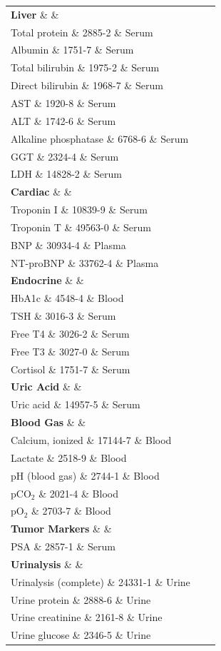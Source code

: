 \begin{longtable}{@{}lll@{}}
\textbf{Liver} \& \& \\
Total protein \& 2885-2 \& Serum \\
Albumin \& 1751-7 \& Serum \\
Total bilirubin \& 1975-2 \& Serum \\
Direct bilirubin \& 1968-7 \& Serum \\
AST \& 1920-8 \& Serum \\
ALT \& 1742-6 \& Serum \\
Alkaline phosphatase \& 6768-6 \& Serum \\
GGT \& 2324-4 \& Serum \\
LDH \& 14828-2 \& Serum \\
\textbf{Cardiac} \& \& \\
Troponin I \& 10839-9 \& Serum \\
Troponin T \& 49563-0 \& Serum \\
BNP \& 30934-4 \& Plasma \\
NT-proBNP \& 33762-4 \& Plasma \\
\textbf{Endocrine} \& \& \\
HbA1c \& 4548-4 \& Blood \\
TSH \& 3016-3 \& Serum \\
Free T4 \& 3026-2 \& Serum \\
Free T3 \& 3027-0 \& Serum \\
Cortisol \& 1751-7 \& Serum \\
\textbf{Uric Acid} \& \& \\
Uric acid \& 14957-5 \& Serum \\
\textbf{Blood Gas} \& \& \\
Calcium, ionized \& 17144-7 \& Blood \\
Lactate \& 2518-9 \& Blood \\
pH (blood gas) \& 2744-1 \& Blood \\
pCO$_2$ \& 2021-4 \& Blood \\
pO$_2$ \& 2703-7 \& Blood \\
\textbf{Tumor Markers} \& \& \\
PSA \& 2857-1 \& Serum \\
\textbf{Urinalysis} \& \& \\
Urinalysis (complete) \& 24331-1 \& Urine \\
Urine protein \& 2888-6 \& Urine \\
Urine creatinine \& 2161-8 \& Urine \\
Urine glucose \& 2346-5 \& Urine \\
\bottomrule
\end{longtable}

